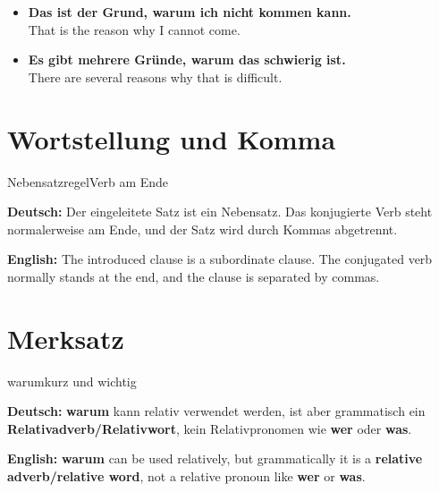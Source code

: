 \documentclass[a4paper,11pt]{article}
\newcommand{\GermanText}[1]{\textbf{Deutsch: }#1\par}
\newcommand{\EnglishText}[1]{{\small\color{SoftGray}\textbf{English: }#1\par}}
\newcommand{\ExampleItem}[2]{\item \textbf{#1}\\{\small\color{SoftGray}#2}}
\begin{document}
\begin{exbox}

\begin{itemize}

\ExampleItem{Das ist der Grund, warum ich nicht kommen kann.}{That is the reason why I cannot come.}

\ExampleItem{Es gibt mehrere Gründe, warum das schwierig ist.}{There are several reasons why that is difficult.}

\end{itemize}

\end{exbox}

\section{Wortstellung und Komma}

\begin{grammarentry}{Nebensatzregel}{Verb am Ende}

\GermanText{Der eingeleitete Satz ist ein Nebensatz. Das konjugierte Verb steht normalerweise am Ende, und der Satz wird durch Kommas abgetrennt.}

\EnglishText{The introduced clause is a subordinate clause. The conjugated verb normally stands at the end, and the clause is separated by commas.}

\end{grammarentry}

\section{Merksatz}

\begin{grammarentry}{warum}{kurz und wichtig}

\GermanText{\textbf{warum} kann relativ verwendet werden, ist aber grammatisch ein \textbf{Relativadverb/Relativwort}, kein Relativpronomen wie \textbf{wer} oder \textbf{was}.}

\EnglishText{\textbf{warum} can be used relatively, but grammatically it is a \textbf{relative adverb/relative word}, not a relative pronoun like \textbf{wer} or \textbf{was}.}

\end{grammarentry}
\end{document}
